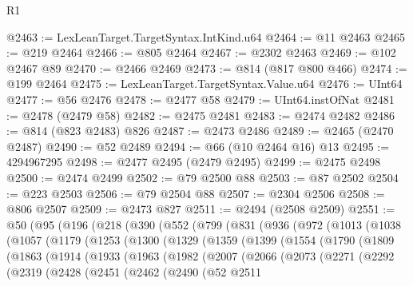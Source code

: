\begin{lexlean}{R1}
\begin{coremodule}
@2463 := LexLeanTarget.TargetSyntax.IntKind.u64
@2464 := @11 @2463
@2465 := @219 @2464
@2466 := @805 @2464
@2467 := @2302 @2463
@2469 := @102 @2467 @89
@2470 := @2466 @2469
@2473 := @814 (@817 @800 @466)
@2474 := @199 @2464
@2475 := LexLeanTarget.TargetSyntax.Value.u64
@2476 := UInt64
@2477 := @56 @2476
@2478 := @2477 @58
@2479 := UInt64.instOfNat
@2481 := @2478 (@2479 @58)
@2482 := @2475 @2481
@2483 := @2474 @2482
@2486 := @814 (@823 @2483) @826
@2487 := @2473 @2486
@2489 := @2465 (@2470 @2487)
@2490 := @52 @2489
@2494 := @66 (@10 @2464 @16) @13
@2495 := 4294967295
@2498 := @2477 @2495 (@2479 @2495)
@2499 := @2475 @2498
@2500 := @2474 @2499
@2502 := @79 @2500 @88
@2503 := @87 @2502
@2504 := @223 @2503
@2506 := @79 @2504 @88
@2507 := @2304 @2506
@2508 := @806 @2507
@2509 := @2473 @827
@2511 := @2494 (@2508 @2509)
@2551 := @50
    (@95
      (@196
        (@218
          (@390
            (@552
              (@799
                (@831
                  (@936
                    (@972
                      (@1013
                        (@1038
                          (@1057
                            (@1179
                              (@1253
                                (@1300
                                  (@1329
                                    (@1359
                                      (@1399
                                        (@1554
                                          (@1790
                                            (@1809
                                              (@1863
                                                (@1914
                                                  (@1933
                                                    (@1963
                                                      (@1982
                                                        (@2007
                                                          (@2066
                                                            (@2073
                                                              (@2271
                                                                (@2292
                                                                  (@2319
                                                                    (@2428
                                                                      (@2451
                                                                        (@2462
                                                                          (@2490
                                                                            (@52
                                                                              @2511

\end{coremodule}
\end{lexlean}
